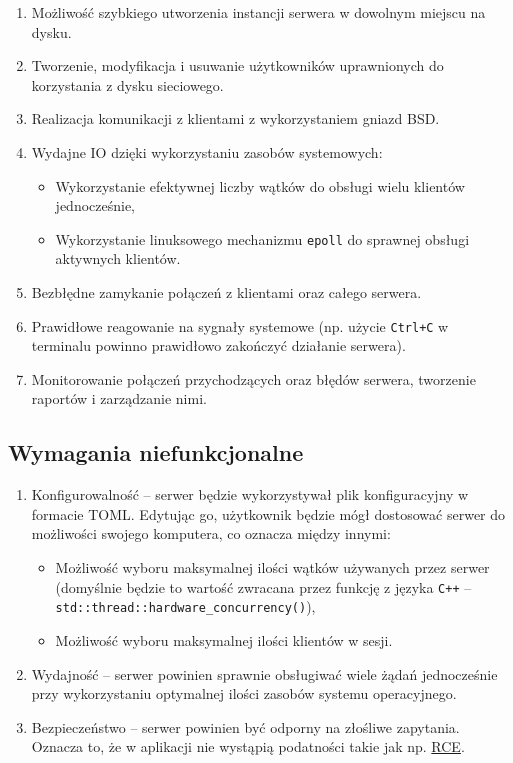 \documentclass[10pt,a4paper]{article}
\begin{document}
\begin{enumerate}
    \item Możliwość szybkiego utworzenia instancji serwera w dowolnym miejscu na dysku.
    \item Tworzenie, modyfikacja i usuwanie użytkowników uprawnionych do korzystania z dysku sieciowego.
    \item Realizacja komunikacji z klientami z wykorzystaniem gniazd BSD.
    \item Wydajne IO dzięki wykorzystaniu zasobów systemowych:
    \begin{itemize}
        \item Wykorzystanie efektywnej liczby wątków do obsługi wielu klientów jednocześnie,
        \item Wykorzystanie linuksowego mechanizmu \texttt{epoll} do sprawnej obsługi aktywnych klientów.
    \end{itemize}
    \item Bezbłędne zamykanie połączeń z klientami oraz całego serwera.
    \item Prawidłowe reagowanie na sygnały systemowe (np. użycie \texttt{Ctrl+C} w terminalu powinno prawidłowo zakończyć działanie serwera).
    \item Monitorowanie połączeń przychodzących oraz błędów serwera, tworzenie raportów i zarządzanie nimi.
\end{enumerate}

\subsection{Wymagania niefunkcjonalne}

\begin{enumerate}
    \item Konfigurowalność -- serwer będzie wykorzystywał plik konfiguracyjny w formacie TOML. Edytując go, użytkownik będzie mógł dostosować serwer do możliwości swojego komputera, co oznacza między innymi:
    \begin{itemize}
        \item Możliwość wyboru maksymalnej ilości wątków używanych przez serwer (domyślnie będzie to wartość zwracana przez funkcję z języka \texttt{C++} -- \texttt{std::thread::hardware\_concurrency()}),
        \item Możliwość wyboru maksymalnej ilości klientów w sesji.
    \end{itemize}
    
    \item Wydajność -- serwer powinien sprawnie obsługiwać wiele żądań jednocześnie przy wykorzystaniu optymalnej ilości zasobów systemu operacyjnego.
    
    \item Bezpieczeństwo -- serwer powinien być odporny na złośliwe zapytania. Oznacza to, że w aplikacji nie wystąpią podatności takie jak np. \href{https://en.wikipedia.org/wiki/Arbitrary_code_execution}{RCE}.
\end{enumerate}
\end{document}
